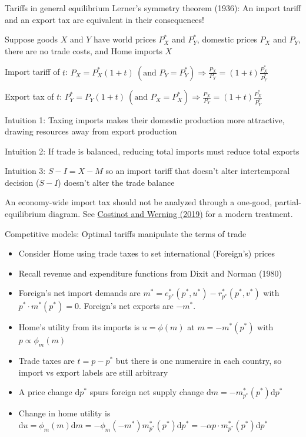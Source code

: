 \documentclass[11pt,notes=hide,aspectratio=169]{beamer}
\begin{document}
\begin{frame}{Tariffs in general equilibrium}
Lerner's symmetry theorem (1936): An import tariff and an export tax are equivalent in their consequences!
\begin{itemize}
{\small
	\item Suppose goods $X$ and $Y$ have world prices $P_X^*$ and $P_Y^*$, domestic prices $P_X$ and $P_Y$, there are no trade costs, and Home imports $X$
	\item Import tariff of $t$: $P_X = P_X^* (1+t) \ (\text{and } P_Y=P_Y^*) \Rightarrow \frac{P_X}{P_Y} = (1+t) \frac{P_X^*}{P_Y^*}$
	\item Export tax of $t$: $P_Y^* = P_Y (1+t) \ (\text{and } P_X=P_X^*) \Rightarrow \frac{P_X}{P_Y} = (1+t) \frac{P_X^*}{P_Y^*}$
	\item Intuition 1: Taxing imports makes their domestic production more attractive, drawing resources away from export production
	\item Intuition 2: If trade is balanced, reducing total imports must reduce total exports
	\item Intuition 3: $S - I = X - M$ so an import tariff that doesn't alter intertemporal decision ($S-I$) doesn't alter the trade balance
}
\end{itemize}
An economy-wide import tax should not be analyzed through a one-good, partial-equilibrium diagram.
See \href{https://www.aeaweb.org/articles?id=10.1257/aeri.20170006}{Costinot and Werning (2019)} for a modern treatment.
\end{frame}
\begin{frame}{Competitive models: Optimal tariffs manipulate the terms of trade}
\begin{itemize}
\item Consider Home using trade taxes to set international (Foreign's) prices
\item Recall revenue and expenditure functions from Dixit and Norman (1980)
\item Foreign's net import demands are $m^* = e^{*}_{p^*}(p^*,u^*) - r^{*}_{p^*}(p^*,v^*)$ with $p^* \cdot m^*(p^*) = 0$. Foreign's net exports are $-m^*$.
\item Home's utility from its imports is $u = \phi(m)$ at $m=-m^*(p^*)$ with $p \propto \phi_m(m)$
\item Trade taxes are $t = p - p^*$ but there is one numeraire in each country, so import vs export labels are still arbitrary
\item A price change $\textrm{d} p^*$ spurs foreign net supply change $\textrm{d} m = -m^{*}_{p^*}(p^*)\textrm{d} p^*$
\item Change in home utility is $\textrm{d} u = \phi_m(m) \textrm{d} m = - \phi_m(-m^*) m^{*}_{p^*}(p^*)\textrm{d} p^* = - \alpha p \cdot m^{*}_{p^*}(p^*)\textrm{d} p^*$
\end{itemize}
\end{frame}
\end{document}
